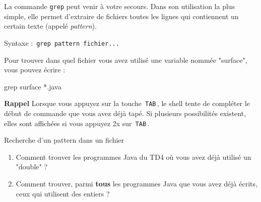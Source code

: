 \documentclass[a4paper,11pt]{article}
\begin{document}
            	\par
        
			
		La commande \verb_grep_ peut venir \`a votre secours. Dans son utilisation la plus simple, elle permet d'extraire de fichiers toutes les lignes qui contiennent un certain texte (appel\'e 
		\textit{pattern}).
					
		\par
		Syntaxe : \,\verb|grep pattern fichier...|\,
                 \par
        
			
				
           	\begin{Tutoriel}{}
				Pour trouver dans quel fichier vous avez utilis\'e une variable
				nomm\'ee "surface", vous pouvez \'ecrire :
				\begin{Console}
					grep surface *.java
				\end{Console}
			\end{Tutoriel}
            \par
        

        
			\textbf{Rappel} Lorsque vous appuyez sur la touche \,\verb|TAB|\,,
			le shell tente de compl\'eter le d\'ebut de commande que vous avez
			d\'ej\`a tap\'e.  Si plusieurs possibilit\'es existent, elles sont
			affich\'ees si vous appuyez 2x sur  \,\verb|TAB|\,.  
        
            	\par
        
			
		\begin{Exercice}{Recherche d'un pattern dans un fichier} 
			\begin{enumerate}
				\item Comment trouver les programmes Java du TD4 o\`u vous avez d\'ej\`a utilis\'e un "double" ?
		 
		 		\item Comment trouver, parmi \textbf{tous} les programmes Java que vous avez d\'ej\`a \'ecrits, ceux qui utilisent des entiers ?
			\end{enumerate}
			\par\medskip
            \par

		\end{Exercice}		
\end{document}
